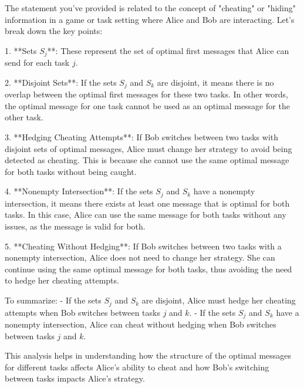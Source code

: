 The statement you've provided is related to the concept of "cheating" or "hiding" information in a game or task setting where Alice and Bob are interacting. Let's break down the key points:

1. **Sets \( S_j \)**: These represent the set of optimal first messages that Alice can send for each task \( j \).

2. **Disjoint Sets**: If the sets \( S_j \) and \( S_k \) are disjoint, it means there is no overlap between the optimal first messages for these two tasks. In other words, the optimal message for one task cannot be used as an optimal message for the other task.

3. **Hedging Cheating Attempts**: If Bob switches between two tasks with disjoint sets of optimal messages, Alice must change her strategy to avoid being detected as cheating. This is because she cannot use the same optimal message for both tasks without being caught.

4. **Nonempty Intersection**: If the sets \( S_j \) and \( S_k \) have a nonempty intersection, it means there exists at least one message that is optimal for both tasks. In this case, Alice can use the same message for both tasks without any issues, as the message is valid for both.

5. **Cheating Without Hedging**: If Bob switches between two tasks with a nonempty intersection, Alice does not need to change her strategy. She can continue using the same optimal message for both tasks, thus avoiding the need to hedge her cheating attempts.

To summarize:
- If the sets \( S_j \) and \( S_k \) are disjoint, Alice must hedge her cheating attempts when Bob switches between tasks \( j \) and \( k \).
- If the sets \( S_j \) and \( S_k \) have a nonempty intersection, Alice can cheat without hedging when Bob switches between tasks \( j \) and \( k \).

This analysis helps in understanding how the structure of the optimal messages for different tasks affects Alice's ability to cheat and how Bob's switching between tasks impacts Alice's strategy.